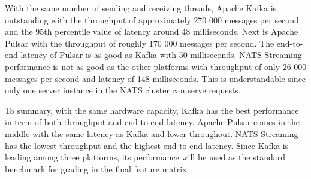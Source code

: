 \fi
With the same number of sending and receiving threads, Apache Kafka is outstanding with the throughput of approximately 270 000 messages per second and the 95th percentile value of latency around 48 milliseconds. Next is Apache Pulsar with the throughput of roughly 170 000 messages per second. The end-to-end latency of Pulsar is as good as Kafka with 50 milliseconds. NATS Streaming performance is not as good as the other platforms with throughput of only 26 000 messages per second and latency of 148 milliseconds. This is understandable since only one server instance in the NATS cluster can serve requests. 

To summary, with the same hardware capacity, Kafka has the best performance in term of both throughput and end-to-end latency. Apache Pulsar comes in the middle with the same latency as Kafka and lower throughout. NATS Streaming has the lowest throughput and the highest end-to-end latency. Since Kafka is leading among three platforms, its performance will be used as the standard benchmark for grading in the final feature matrix. 
